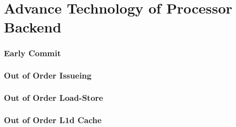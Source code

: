 \section{Advance Technology of Processor Backend}

\begin{frame}
    \frametitle{Early Commit}

\end{frame}

\begin{frame}
    \frametitle{Out of Order Issueing}

\end{frame}

\begin{frame}
    \frametitle{Out of Order Load-Store }

\end{frame}

\begin{frame}
    \frametitle{Out of Order L1d Cache}

\end{frame}
